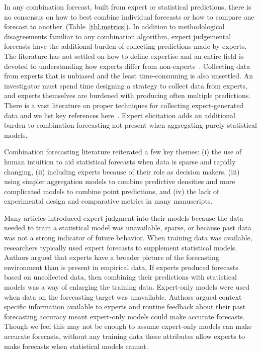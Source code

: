 \documentclass[preprint]{elsarticle}
\begin{document}
In any combination forecast, built from expert or statistical predictions, there is no consensus on how to best combine individual forecasts or how to compare one forecast to another~(Table~\ref{tbl.metrics}).
In addition to methodological disagreements familiar to any combination algorithm, expert judgemental forecasts have the additional burden of collecting predictions made by experts.
The literature has not settled on how to define expertise and an entire field is devoted to understanding how experts differ from non-experts~\cite{dawid1995coherent,farrington2006nature,ericsson2007capturing,rikers2005recent,de2014thought}.
Collecting data from experts that is unbiased and the least time-consuming is also unsettled.
An investigator must spend time designing a strategy to collect data from experts, and experts themselves are burdened with producing often multiple predictions. 
There is a vast literature on proper techniques for collecting expert-generated data and
we list key references here~\cite{ayyub2001elicitation,yousuf2007using,powell2003delphi,normand1998eliciting,leal2007eliciting,martin2012eliciting}.
Expert elicitation adds an additional burden to combination forecasting not present when aggregating purely statistical models.

Combination forecasting literature reiterated a few key themes: (i) the use of human intuition to aid statistical forecasts when data is sparse and rapidly changing, (ii) including experts because of their role as decision makers, (iii) using simpler aggregation models to combine predictive densities and more complicated models to combine point predictions, and (iv) the lack of experimental design and comparative metrics in many manuscripts.

Many articles introduced expert judgment into their models because the data needed to train a statistical model was unavailable, sparse, or because past data was not a strong indicator of future behavior.
When training data was available, researchers typically used expert forecasts to supplement statistical models.
Authors argued that experts have a broader picture of the forecasting environment than is present in empirical data. 
If experts produced forecasts based on uncollected data, then combining their predictions with statistical models was a way of enlarging the training data. 
Expert-only models were used when data on the forecasting target was unavailable.
Authors argued context-specific information available to experts and routine feedback about their past forecasting accuracy meant expert-only models could make accurate forecasts.
Though we feel this may not be enough to assume expert-only models can make accurate forecasts, without any training data these attributes allow experts to make forecasts when statistical models cannot.
\end{document}
